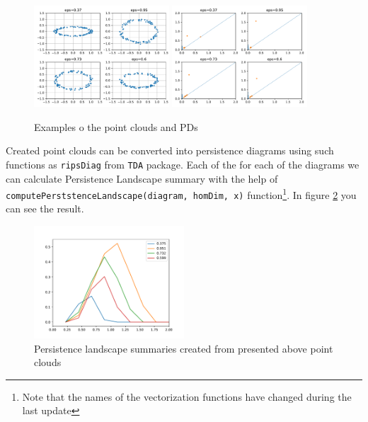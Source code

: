 \documentclass[conference, onecolumn]{IEEEtran}
\begin{document}
\begin{figure}
  \centering
  \includegraphics[width = 0.45\textwidth]{clouds.pdf}%
  \includegraphics[width = 0.45\textwidth]{PDs.pdf}
  \caption{Examples o the point clouds and PDs}
  \label{fig:XPDs}
\end{figure}



Created point clouds can be converted into persistence diagrams using such functions as \texttt{ripsDiag} from \texttt{TDA} package. Each of the for each of the diagrams we can calculate Persistence Landscape summary with the help of \texttt{computePerststenceLandscape(diagram, homDim, x)} function\footnote{Note that the names of the vectorization functions have changed during the last update}. In figure \ref{fig:PLs} you can see the result.

\begin{figure}
  \centering
  \includegraphics[width = 0.5\textwidth]{PL.pdf}
  \caption{Persistence landscape summaries created from presented above point clouds}
  \label{fig:PLs}
\end{figure}
\end{document}
